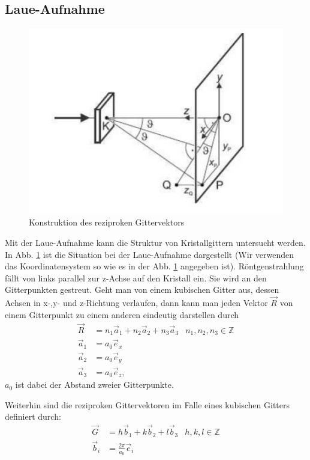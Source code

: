 \subsection{Laue-Aufnahme}
\begin{figure}
\centering
\includegraphics[scale=0.482]{data/laue/th_laue.png}
\caption{Konstruktion des reziproken Gittervektors \cite{praktikumsheft}}
\label{fig:laue_th}
\end{figure}
Mit der Laue-Aufnahme kann die Struktur von Kristallgittern untersucht werden. In Abb. \ref{fig:laue_th} ist die Situation bei der Laue-Aufnahme dargestellt (Wir verwenden das Koordinatensystem so wie es in der Abb. \ref{fig:laue_th} angegeben ist). Röntgenstrahlung fällt von links parallel zur z-Achse auf den Kristall ein. Sie wird an den Gitterpunkten gestreut. Geht man von einem kubischen Gitter aus, dessen Achsen in x-,y- und z-Richtung verlaufen, dann kann man jeden Vektor $\vec{R}$ von einem Gitterpunkt zu einem anderen eindeutig darstellen durch
\begin{align*}
\vec{R} &= n_1\vec{a}_1 + n_2\vec{a}_2 + n_3\vec{a}_3 & n_1,n_2,n_3 \in \mathbb{Z}\\
	\vec{a}_1 &= a_0\vec{e}_x\\
	\vec{a}_2 &= a_0\vec{e}_y\\
	\vec{a}_3 &= a_0\vec{e}_z,
\end{align*}
$a_0$ ist dabei der Abstand zweier Gitterpunkte.

Weiterhin sind die reziproken Gittervektoren im Falle eines kubischen Gitters definiert durch:
\begin{align*}
\vec{G} &= h\vec{b}_1 + k\vec{b}_2 + l\vec{b}_3 & h,k,l \in \mathbb{Z}\\
\vec{b}_i &= \frac{2\pi}{a_0} \vec{e}_i
\end{align*}

